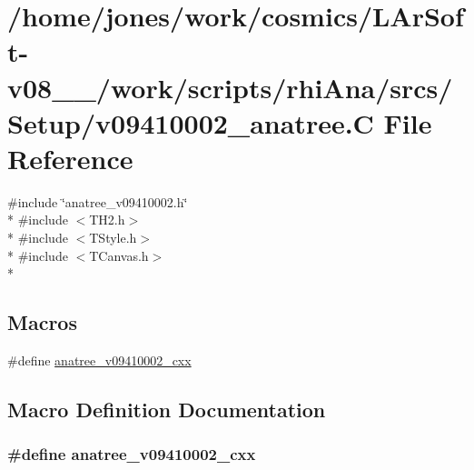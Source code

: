 \hypertarget{v09410002__anatree_8C}{\section{/home/jones/work/cosmics/\-L\-Ar\-Soft-\/v08\-\_\-\_/work/scripts/rhi\-Ana/srcs/\-Setup/v09410002\-\_\-anatree.C File Reference}
\label{v09410002__anatree_8C}
}
{\ttfamily \#include \char`\"{}anatree\-\_\-v09410002.\-h\char`\"{}}\\*
{\ttfamily \#include $<$T\-H2.\-h$>$}\\*
{\ttfamily \#include $<$T\-Style.\-h$>$}\\*
{\ttfamily \#include $<$T\-Canvas.\-h$>$}\\*
\subsection*{Macros}
\begin{DoxyCompactItemize}
\item 
\#define \hyperlink{v09410002__anatree_8C_a32cc3efd6e544d4dd5d479a8843e46dc}{anatree\-\_\-v09410002\-\_\-cxx}
\end{DoxyCompactItemize}


\subsection{Macro Definition Documentation}
\hypertarget{v09410002__anatree_8C_a32cc3efd6e544d4dd5d479a8843e46dc}{
\subsubsection[{anatree\-\_\-v09410002\-\_\-cxx}]{\setlength{\rightskip}{0pt plus 5cm}\#define anatree\-\_\-v09410002\-\_\-cxx}}\label{v09410002__anatree_8C_a32cc3efd6e544d4dd5d479a8843e46dc}

